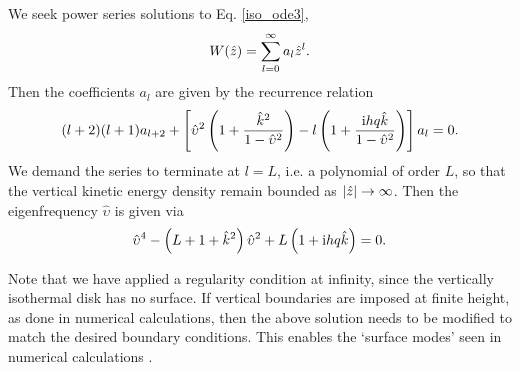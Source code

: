 
We seek power series solutions to Eq. \ref{iso_ode3}, 
\begin{align}
  W(\hat{z}) = \sum_{l=0}^\infty a_l\hat{z}^l. 
\end{align}
Then the coefficients $a_l$ are given by the recurrence relation
\begin{align}
  (l+2)(l+1)a_{l+2} +
  \left[\hat{\upsilon}^2\left(1+\frac{\hat{k}^2}{1-\hat{\upsilon}^2}\right)
    - l\left(1+\frac{\mathrm{i} h q
        \hat{k}}{1-\hat{\upsilon}^2}\right)\right] a_l = 0. 
\end{align}
We demand the series to terminate  at $l=L$, i.e. a polynomial of
order $L$, so that the vertical kinetic energy density remain bounded as 
$|\hat{z}|\to\infty$.  Then the eigenfrequency $\hat{\upsilon}$ is given via 
\begin{align}
\hat{\upsilon}^4 - \left(L+1+\hat{k}^2\right)\hat{\upsilon}^2 + L\left(1 +
  \mathrm{i} h q \hat{k}\right) = 0. \label{simple_growth}
\end{align}

Note that we have applied a regularity condition at infinity, since
the vertically isothermal disk has no surface. If vertical boundaries
are imposed at finite height, as done in numerical calculations, then
the above solution needs to be modified to match the desired boundary
conditions. This enables the `surface modes' seen in numerical
calculations . 

